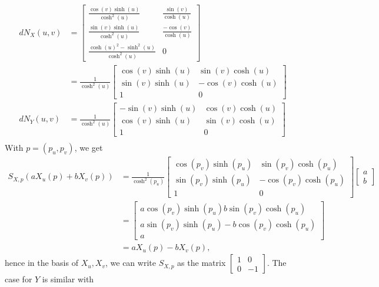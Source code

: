 \documentclass{article}
\theoremstyle{definition}
\begin{document}
\begin{align*}
	dN_X(u, v)
	&=
	\begin{bmatrix}
		\frac{\cos(v)\sinh(u)}{\cosh^2(u)} & \frac{\sin(v)}{\cosh(u)} \\
		\frac{\sin(v)\sinh(u)}{\cosh^2(u)} & \frac{-\cos(v)}{\cosh(u)} \\
		\frac{\cosh(u)^2 - \sinh^2(u)}{\cosh^2(u)} & 0
	\end{bmatrix} \\
	&=
	\frac{1}{\cosh^2(u)}
	\begin{bmatrix}
		\cos(v)\sinh(u) & \sin(v)\cosh(u) \\
		\sin(v)\sinh(u) & -\cos(v)\cosh(u) \\
		1 & 0
	\end{bmatrix} \\
	dN_Y(u, v)
	&=
	\frac{1}{\cosh^2(u)}
	\begin{bmatrix}
		-\sin(v)\sinh(u) & \cos(v)\cosh(u) \\
		\cos(v)\sinh(u) & \sin(v)\cosh(u) \\
		1 & 0
	\end{bmatrix} \\
\end{align*}
With $p = (p_u, p_v)$, we get
\begin{align*}
	S_{X, p}(a X_u(p) + b X_v(p))
	&=
	\frac{1}{\cosh^2(p_u)}
	\begin{bmatrix}
		\cos(p_v)\sinh(p_u) & \sin(p_v)\cosh(p_u) \\
		\sin(p_v)\sinh(p_u) & -\cos(p_v)\cosh(p_u) \\
		1 & 0
	\end{bmatrix}
	\begin{bmatrix}
		a \\
		b
	\end{bmatrix} \\
	&=
	\begin{bmatrix}
		a\cos(p_v)\sinh(p_u) b\sin(p_v)\cosh(p_u) \\
		a\sin(p_v)\sinh(p_u) -b\cos(p_v)\cosh(p_u) \\
		a
	\end{bmatrix} \\
	&=
	aX_u(p) - bX_v(p),
\end{align*}
hence in the basis of $X_u, X_v$, we can write $S_{X, p}$ as the matrix
$\begin{bmatrix} 1 & 0 \\ 0 & -1 \end{bmatrix}$. The case for $Y$ is similar with
\end{document}
